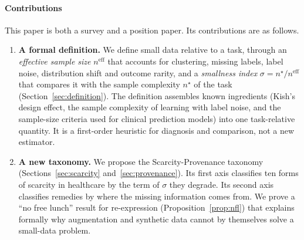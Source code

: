 \documentclass[acmsmall,screen,review]{acmart}
\newcommand{\eff}{\mathrm{eff}}
\theoremstyle{acmdefinition}
\begin{document}
\paragraph{Contributions} This paper is both a survey and a position paper. Its contributions are as follows.
\begin{enumerate}[leftmargin=*]
\item \textbf{A formal definition.} We define small data relative to a task, through an \emph{effective sample size} $n^{\eff}$ that accounts for clustering, missing labels, label noise, distribution shift and outcome rarity, and a \emph{smallness index} $\sigma = n^{\star}/n^{\eff}$ that compares it with the sample complexity $n^{\star}$ of the task (Section~\ref{sec:definition}). The definition assembles known ingredients (Kish's design effect, the sample complexity of learning with label noise, and the sample-size criteria used for clinical prediction models) into one task-relative quantity. It is a first-order heuristic for diagnosis and comparison, not a new estimator.
\item \textbf{A new taxonomy.} We propose the Scarcity-Provenance taxonomy (Sections~\ref{sec:scarcity} and~\ref{sec:provenance}). Its first axis classifies ten forms of scarcity in healthcare by the term of $\sigma$ they degrade. Its second axis classifies remedies by where the missing information comes from. We prove a ``no free lunch'' result for re-expression (Proposition~\ref{prop:nfl}) that explains formally why augmentation and synthetic data cannot by themselves solve a small-data problem.
\begin{figure}[t]
\centering
{}
\end{figure}
\end{enumerate}
\end{document}
